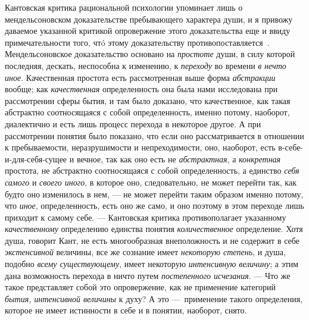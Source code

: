 \documentclass[twoside]{article}
\begin{document}
{Кантовская критика рациональной психологии упоминает лишь о
мендельсоновском доказательстве пребывающего характера души, и я привожу
даваемое указанной критикой опровержение этого доказательства еще и ввиду
примечательности того, чтó этому доказательству
противопоставляется~\label{bkm:bm99}.
Мендельсоновское доказательство основано на
{\em простоте} души, в
силу которой последняя, дескать, неспособна к изменению, к
{\em переходу} во времени
{\em в}
{\em нечто иное}.
Качественная простота есть рассмотренная выше форма
{\em абстракции} вообще;
как {\em качественная}
определенность она была нами исследована при рассмотрении
сферы бытия, и там было доказано, что качественное, как такая абстрактно
соотносящаяся с собой определенность, именно потому, наоборот, диалектично
и есть лишь процесс перехода в некоторое другое. А при рассмотрении понятия
было показано, что если оно рассматривается в отношении к пребываемости,
неразрушимости и непреходимости, оно, наоборот, есть
в-себе-и-для-себя-сущее и вечное, так как оно есть не
{\em абстрактная}, а
{\em конкретная}
простота, не абстрактно соотносящаяся с собой определенность,
а единство {\em себя самого}
и {\em своего иного},
в которое оно, следовательно, не может перейти так,
как будто оно изменилось в нем, — не может перейти таким
образом именно потому, что
{\em иное},
определенность, есть оно же само, и оно поэтому в этом
переходе лишь приходит к самому себе. — Кантовская критика
противополагает указанному
{\em качественному}
определению единства понятия
{\em количественное}
определение. Хотя душа, говорит Кант, не есть многообразная
внеположность и не содержит в себе
{\em экстенсивной}
величины, все же сознание имеет
{\em некоторую степень},
и душа, подобно {\em всему
существующему}, имеет некоторую
{\em интенсивную величину};
а этим дана возможность перехода в ничто путем
{\em постепенного исчезания}. —
Что же такое представляет собой это опровержение, как не
применение категорий {\em бытия,
интенсивной величины} к духу? А это
—~применение такого определения, которое не имеет истинности
в себе и в понятии, наоборот, снято.

}
\end{document}
